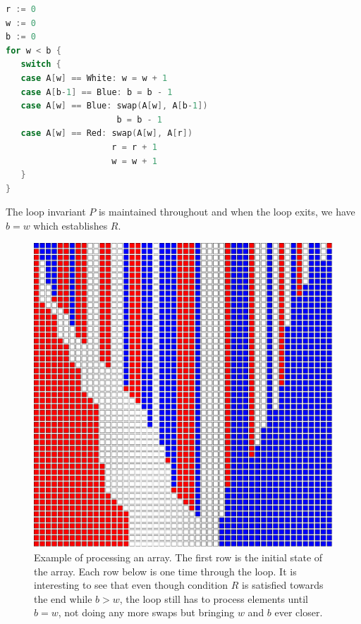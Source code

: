 \begin{lstlisting}[language=Go, frame=single]  
r := 0
w := 0
b := 0
for w < b {
   switch {
   case A[w] == White: w = w + 1
   case A[b-1] == Blue: b = b - 1
   case A[w] == Blue: swap(A[w], A[b-1]) 
                      b = b - 1
   case A[w] == Red: swap(A[w], A[r])
                     r = r + 1
                     w = w + 1
   }
}          
\end{lstlisting}

The loop invariant $P$ is maintained throughout and when the loop exits, we have $b = w$ which establishes $R$.

\begin{figure}
\includegraphics[scale=0.5]{largerun.pdf}
\caption{Example of processing an array. The first row is the initial state of the array. Each row below is one time through the loop. It is interesting to see that even though condition $R$ is satisfied towards the end while $b > w$, the loop still has to process elements until $b = w$, not doing any more swaps but bringing $w$ and $b$ ever closer.}
\end{figure}


